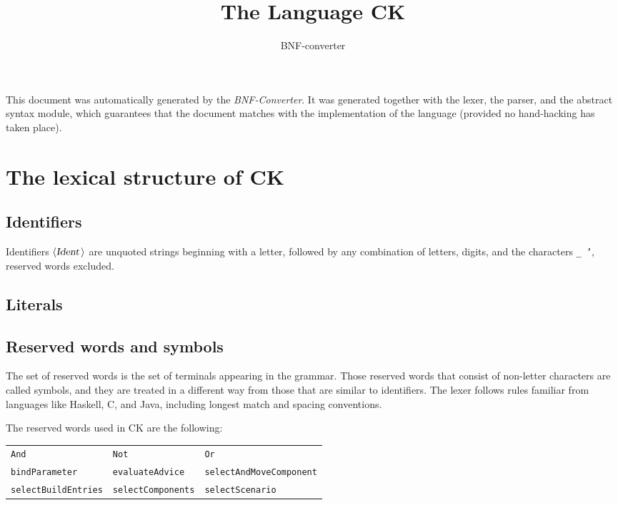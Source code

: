 \documentclass[a4paper,11pt]{article}
\author{BNF-converter}
\title{The Language CK}
\begin{document}
\maketitle

\newcommand{\emptyP}{\mbox{$\epsilon$}}
\newcommand{\terminal}[1]{\mbox{{\texttt {#1}}}}
\newcommand{\nonterminal}[1]{\mbox{$\langle \mbox{{\sl #1 }} \! \rangle$}}
\newcommand{\arrow}{\mbox{::=}}
\newcommand{\delimit}{\mbox{$|$}}
\newcommand{\reserved}[1]{\mbox{{\texttt {#1}}}}
\newcommand{\literal}[1]{\mbox{{\texttt {#1}}}}
\newcommand{\symb}[1]{\mbox{{\texttt {#1}}}}

This document was automatically generated by the {\em BNF-Converter}. It was generated together with the lexer, the parser, and the abstract syntax module, which guarantees that the document matches with the implementation of the language (provided no hand-hacking has taken place).

\section*{The lexical structure of CK}
\subsection*{Identifiers}
Identifiers \nonterminal{Ident} are unquoted strings beginning with a letter,
followed by any combination of letters, digits, and the characters {\tt \_ '},
reserved words excluded.


\subsection*{Literals}


\subsection*{Reserved words and symbols}
The set of reserved words is the set of terminals appearing in the grammar. Those reserved words that consist of non-letter characters are called symbols, and they are treated in a different way from those that are similar to identifiers. The lexer follows rules familiar from languages like Haskell, C, and Java, including longest match and spacing conventions.

The reserved words used in CK are the following: \\

\begin{tabular}{lll}
{\reserved{And}} &{\reserved{Not}} &{\reserved{Or}} \\
{\reserved{bindParameter}} &{\reserved{evaluateAdvice}} &{\reserved{selectAndMoveComponent}} \\
{\reserved{selectBuildEntries}} &{\reserved{selectComponents}} &{\reserved{selectScenario}} \\
\end{tabular}\\
\end{document}
